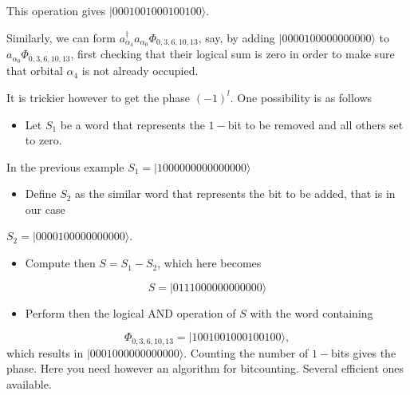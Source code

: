\documentclass[graybox,sectrefs,envcountresetchap,open=right]{svmonodo}
\begin{document}
This operation gives $|0001001000100100\rangle$. 

Similarly, we can form $a^{\dagger}_{\alpha_4}a_{\alpha_0}\Phi_{0,3,6,10,13}$, say, by adding 
$|0000100000000000\rangle$ to $a_{\alpha_0}\Phi_{0,3,6,10,13}$, first checking that their logical sum
is zero in order to make sure that orbital $\alpha_4$ is not already occupied. 







It is trickier however to get the phase $(-1)^l$. 
One possibility is as follows
\begin{itemize}
\item Let $S_1$ be a word that represents the $1-$bit to be removed and all others set to zero.
\end{itemize}

\noindent
In the previous example $S_1=|1000000000000000\rangle$
\begin{itemize}
\item Define $S_2$ as the similar word that represents the bit to be added, that is in our case
\end{itemize}

\noindent
$S_2=|0000100000000000\rangle$.
\begin{itemize}
\item Compute then $S=S_1-S_2$, which here becomes
\end{itemize}

\noindent
\[
S=|0111000000000000\rangle
\]
\begin{itemize}
\item Perform then the logical AND operation of $S$ with the word containing 
\end{itemize}

\noindent
\[
\Phi_{0,3,6,10,13} = |1001001000100100\rangle,
\]
which results in $|0001000000000000\rangle$. Counting the number of $1-$bits gives the phase.  Here you need however an algorithm for bitcounting. Several efficient ones available. 
\end{document}
